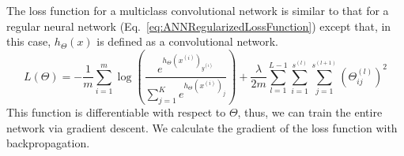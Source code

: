 The loss function for a multiclass convolutional network is similar to that for a regular neural network (Eq.~\ref{eq:ANNRegularizedLossFunction}) except that, in this case, $h_\Theta(x)$ is defined as a convolutional network.
\begin{equation}
	L(\Theta) = -\frac{1}{m} \sum_{i=1}^m \log \left ( \frac{ e^{h_\Theta(x^{(i)})_{y^{(i)}}} }{ \sum_{j=1}^K e^{ h_\Theta (x^{(i)})_j} } \right ) + \frac{\lambda}{2m}\sum_{l=1}^{L-1}\sum_{i=1}^{s^{(l)}}\sum_{j=1}^{s^{(l+1)}} \left(\Theta^{(l)}_{ij}\right)^2
	\label{eq:ConvNetLossFunction}
\end{equation}
This function is differentiable with respect to $\Theta$, thus, we can train the entire network via gradient descent. We calculate the gradient of the loss function with backpropagation.%

